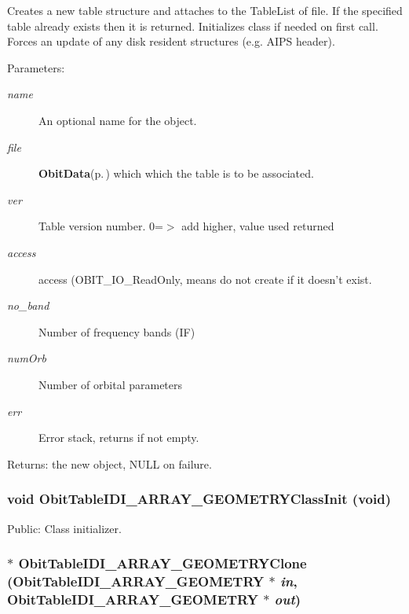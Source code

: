 Creates a new table structure and attaches to the Table\-List of file. If the specified table already exists then it is returned. Initializes class if needed on first call. Forces an update of any disk resident structures (e.g. AIPS header). \begin{Desc}
\item[Parameters:]
\begin{description}
\item[{\em name}]An optional name for the object. \item[{\em file}]{\bf Obit\-Data}{\rm (p.\,\pageref{structObitData})} which which the table is to be associated. \item[{\em ver}]Table version number. 0=$>$ add higher, value used returned \item[{\em access}]access (OBIT\_\-IO\_\-Read\-Only, means do not create if it doesn't exist. \item[{\em no\_\-band}]Number of frequency bands (IF) \item[{\em num\-Orb}]Number of orbital parameters \item[{\em err}]Error stack, returns if not empty. \end{description}
\end{Desc}
\begin{Desc}
\item[Returns:]the new object, NULL on failure. \end{Desc}
\subsubsection{\setlength{\rightskip}{0pt plus 5cm}void Obit\-Table\-IDI\_\-ARRAY\_\-GEOMETRYClass\-Init (void)}\label{ObitTableIDI__ARRAY__GEOMETRY_8h_a10}


Public: Class initializer. 

\subsubsection{$\ast$ Obit\-Table\-IDI\_\-ARRAY\_\-GEOMETRYClone ({\bf Obit\-Table\-IDI\_\-ARRAY\_\-GEOMETRY} $\ast$ {\em in}, {\bf Obit\-Table\-IDI\_\-ARRAY\_\-GEOMETRY} $\ast$ {\em out})}\label{ObitTableIDI__ARRAY__GEOMETRY_8h_a15}


